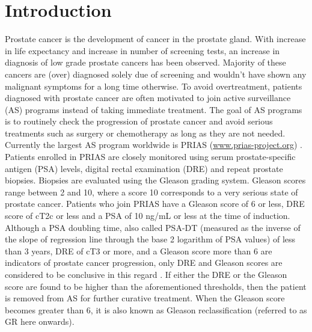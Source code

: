 
\section{Introduction}
\label{sec : introduction}
Prostate cancer is the development of cancer in the prostate gland. With increase in life expectancy and increase in number of screening tests, an increase in diagnosis of low grade prostate cancers has been observed. Majority of these cancers are (over) diagnosed solely due of screening and wouldn't have shown any malignant symptoms for a long time otherwise. To avoid overtreatment, patients diagnosed with prostate cancer are often motivated to join active surveillance (AS) programs instead of taking immediate treatment. The goal of AS programs is to routinely check the progression of prostate cancer and avoid serious treatments such as surgery or chemotherapy as long as they are not needed.\\

Currently the largest AS program worldwide is PRIAS (\url{www.prias-project.org}) \citep{bokhorst2015compliance}. Patients enrolled in PRIAS are closely monitored using serum prostate-specific antigen (PSA) levels, digital rectal examination (DRE) and repeat prostate biopsies. Biopsies are evaluated using the Gleason grading system. Gleason scores range between 2 and 10, where a score 10 corresponds to a very serious state of prostate cancer. Patients who join PRIAS have a Gleason score of 6 or less, DRE score of cT2c or less and a PSA of 10 ng/mL or less at the time of induction. Although a PSA doubling time, also called PSA-DT (measured as the inverse of the slope of regression line through the base 2 logarithm of PSA values) of less than 3 years, DRE of cT3 or more, and a Gleason score more than 6 are indicators of prostate cancer progression, only DRE and Gleason scores are considered to be conclusive in this regard \citep{bokhorst2016decade}. If either the DRE or the Gleason score are found to be higher than the aforementioned thresholds, then the patient is removed from AS for further curative treatment. When the Gleason score becomes greater than 6, it is also known as Gleason reclassification (referred to as GR here onwards).\\

